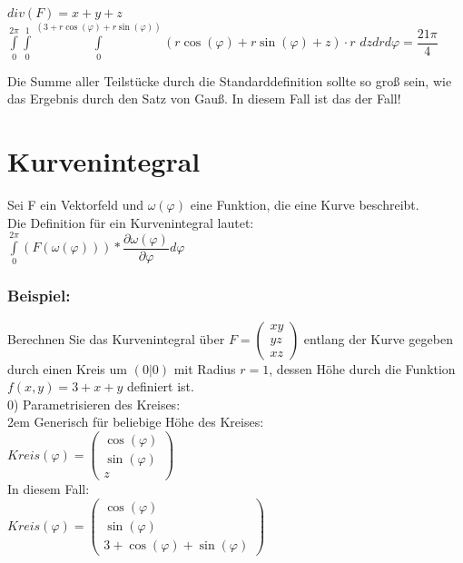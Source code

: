 \documentclass[11pt,final]{scrreprt}
\begin{document}
$ div(F) = x+y+z $\\

$ \int\limits_{0}^{2\pi}\int\limits_{0}^{1}\int\limits_{0}^{(3+r\cos(\varphi)+r\sin(\varphi))} (r\cos(\varphi)+r\sin(\varphi)+z)\cdot r$ $dzdrd\varphi = \dfrac{21\pi}{4}$\\
\par	
\endgroup

Die Summe aller Teilstücke durch die Standarddefinition sollte so groß sein, wie das Ergebnis durch den Satz von Gauß. In diesem Fall ist das der Fall!\\

\section{Kurvenintegral}

Sei F ein Vektorfeld und $\omega(\varphi)$ eine Funktion, die eine Kurve beschreibt.\\
Die Definition für ein Kurvenintegral lautet:\\
$ \int\limits_0^{2\pi} (F(\omega(\varphi))) * \dfrac{\partial\omega(\varphi)}{\partial\varphi} d\varphi $\\

\subsubsection{Beispiel:}

Berechnen Sie das Kurvenintegral über $ F = \left(\begin{matrix}
xy\\ yz\\ xz
\end{matrix}\right) $ entlang der Kurve gegeben durch einen Kreis um $(0|0)$ mit Radius $r=1$, dessen Höhe durch die Funktion $f(x,y)=3+x+y$ definiert ist.\\

0) Parametrisieren des Kreises:\\

\begingroup
\leftskip2em 
Generisch für beliebige Höhe des Kreises:\\
$Kreis(\varphi) = \left(\begin{matrix}
\cos(\varphi)\\ \sin(\varphi)\\ z
\end{matrix}\right)$\\

In diesem Fall:\\
$Kreis(\varphi) = \left(\begin{matrix}
\cos(\varphi)\\ \sin(\varphi)\\ 3+\cos(\varphi)+\sin(\varphi)
\end{matrix}\right)$\\
\par	
\endgroup
\end{document}
